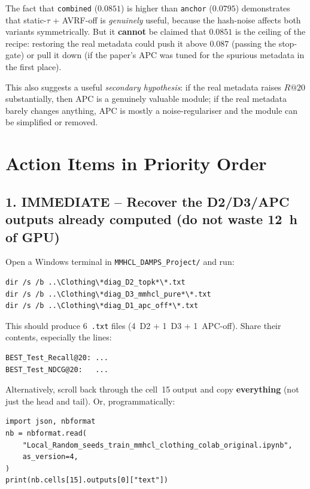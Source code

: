 \documentclass[11pt,a4paper]{article}
\begin{document}
The fact that \texttt{combined} ($0.0851$) is higher than \texttt{anchor}
($0.0795$) demonstrates that static-$\tau$ + AVRF-off is \emph{genuinely}
useful, because the hash-noise affects both variants symmetrically. But it
\textbf{cannot} be claimed that $0.0851$ is the ceiling of the recipe:
restoring the real metadata could push it above $0.087$ (passing the
stop-gate) or pull it down (if the paper's APC was tuned for the spurious
metadata in the first place).

This also suggests a useful \emph{secondary hypothesis}: if the real
metadata raises $R@20$ substantially, then APC is a genuinely valuable
module; if the real metadata barely changes anything, APC is mostly a
noise-regulariser and the module can be simplified or removed.

\section{Action Items in Priority Order}

\subsection*{1. IMMEDIATE -- Recover the D2/D3/APC outputs already computed
(do not waste 12~h of GPU)}

Open a Windows terminal in \texttt{MMHCL\_DAMPS\_Project/} and run:

\begin{lstlisting}
dir /s /b ..\Clothing\*diag_D2_topk*\*.txt
dir /s /b ..\Clothing\*diag_D3_mmhcl_pure*\*.txt
dir /s /b ..\Clothing\*diag_D1_apc_off*\*.txt
\end{lstlisting}

\noindent This should produce 6~\texttt{.txt} files
(4~D2 + 1~D3 + 1~APC-off). Share their contents, especially the lines:

\begin{lstlisting}
BEST_Test_Recall@20: ...
BEST_Test_NDCG@20:   ...
\end{lstlisting}

\noindent Alternatively, scroll back through the cell~15 output and copy
\textbf{everything} (not just the head and tail). Or, programmatically:

\begin{lstlisting}[style=py]
import json, nbformat
nb = nbformat.read(
    "Local_Random_seeds_train_mmhcl_clothing_colab_original.ipynb",
    as_version=4,
)
print(nb.cells[15].outputs[0]["text"])
\end{lstlisting}
\end{document}
